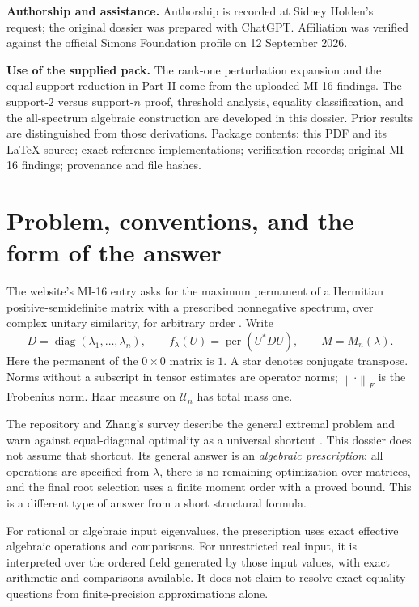 \documentclass[11pt]{article}
\newcommand{\per}{\operatorname{per}}
\newcommand{\diag}{\operatorname{diag}}
\newcommand{\U}{\mathcal U}
\newcommand{\norm}[1]{\left\lVert#1\right\rVert}
\theoremstyle{definition}\newtheorem{definition}[theorem]{Definition}
\theoremstyle{remark}\newtheorem{remark}[theorem]{Remark}
\begin{document}
\begin{titlepage}
\textbf{Authorship and assistance.} Authorship is recorded at Sidney Holden's request; the original dossier was prepared with ChatGPT. Affiliation was verified against the official Simons Foundation profile on 12 September 2026.\par\vspace{3mm}
\textbf{Use of the supplied pack.} The rank-one perturbation expansion and the equal-support reduction in Part II come from the uploaded MI-16 findings. The support-$2$ versus support-$n$ proof, threshold analysis, equality classification, and the all-spectrum algebraic construction are developed in this dossier. Prior results are distinguished from those derivations.
\vfill
{\small Package contents: this PDF and its \LaTeX{} source; exact reference implementations; verification records; original MI-16 findings; provenance and file hashes.}
\end{titlepage}
\begingroup\setlength{\parskip}{0pt}\small\tableofcontents\endgroup
\newpage

\section{Problem, conventions, and the form of the answer}
The website's MI-16 entry asks for the maximum permanent of a Hermitian positive-semidefinite matrix with a prescribed nonnegative spectrum, over complex unitary similarity, for arbitrary order \cite{catalog}. Write
\[
 D=\diag(\lambda_1,\ldots,\lambda_n),\qquad
 f_\lambda(U)=\per(U^*DU),\qquad
 M=M_n(\lambda).
\]
Here the permanent of the $0\times0$ matrix is $1$. A star denotes conjugate transpose. Norms without a subscript in tensor estimates are operator norms; $\norm{\cdot}_F$ is the Frobenius norm. Haar measure on $\U_n$ has total mass one.

The repository and Zhang's survey describe the general extremal problem and warn against equal-diagonal optimality as a universal shortcut \cite{catalog,zhang}. This dossier does not assume that shortcut. Its general answer is an \emph{algebraic prescription}: all operations are specified from $\lambda$, there is no remaining optimization over matrices, and the final root selection uses a finite moment order with a proved bound. This is a different type of answer from a short structural formula.

For rational or algebraic input eigenvalues, the prescription uses exact effective algebraic operations and comparisons. For unrestricted real input, it is interpreted over the ordered field generated by those input values, with exact arithmetic and comparisons available. It does not claim to resolve exact equality questions from finite-precision approximations alone.
\end{document}
